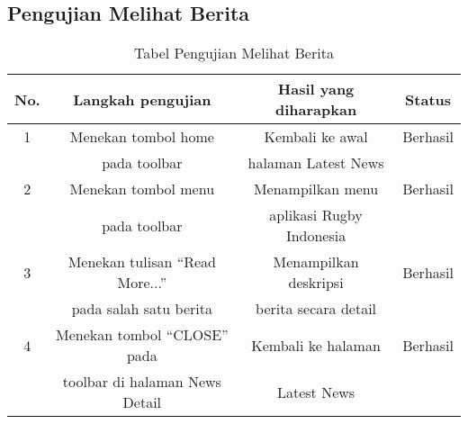 \subsection{Pengujian Melihat Berita}
\begin{table} [H]
    \centering
    \caption{Tabel Pengujian Melihat Berita}
    \begin{tabular}{|c|c|c|c|}
    \hline
       No. & Langkah pengujian & Hasil yang diharapkan & Status  \\ \hline
        1 & Menekan tombol home & Kembali ke awal & Berhasil \\
         & pada toolbar & halaman Latest News &  \\ \hline
        2 & Menekan tombol menu & Menampilkan menu & Berhasil \\
         & pada toolbar & aplikasi Rugby Indonesia &  \\ \hline
        3 & Menekan tulisan ``Read More...'' & Menampilkan deskripsi & Berhasil \\
         & pada salah satu berita & berita secara detail &  \\
          \hline
      4 & Menekan tombol ``CLOSE'' pada & Kembali ke halaman & Berhasil \\
     & toolbar di halaman News Detail & Latest News &  \\
      \hline
    \end{tabular}
    \label{tab:see-news-test}
\end{table}


